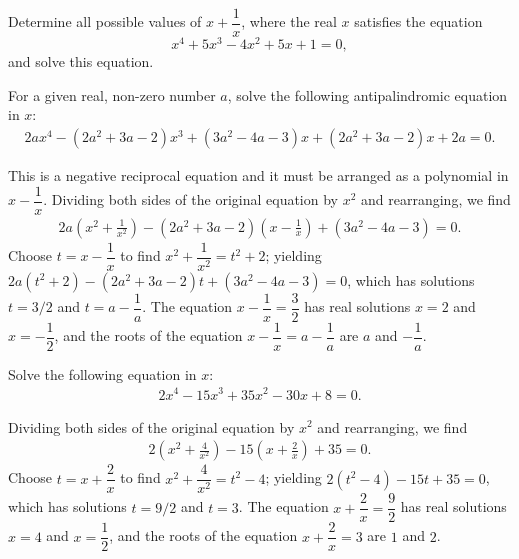 \documentclass[12pt,a4paper]{memoir}
\theoremstyle{definition}
\begin{document}
\begin{question}[name={2000 Denmark (Georg Mohr)}]
	Determine all possible values of $x+\dfrac{1}{x}$, where the real $x$ satisfies the equation
	\[x^4 + 5x^3 - 4x^2 + 5x + 1 = 0,\] and solve this equation.
\end{question}




\begin{question}
	For a given real, non-zero number $a$, solve the following antipalindromic equation in $x$:
	\begin{align*}
		2ax^4-(2a^2+3a-2)x^3+(3a^2-4a-3)x+(2a^2+3a-2)x+2a=0.
	\end{align*}
\end{question}

\begin{solution}
	This is a negative reciprocal equation and it must be arranged as a polynomial in $x-\dfrac{1}{x}$. Dividing both sides of the original equation by $x^2$ and rearranging, we find 
	\begin{align*}
		2a\left(x^2+\frac{1}{x^2}\right) - (2a^2+3a-2)\left(x-\frac{1}{x}\right) + (3a^2-4a-3)=0.
	\end{align*}
	Choose $t=x-\dfrac{1}{x}$ to find $x^2+\dfrac{1}{x^2}=t^2+2$; yielding $2a(t^2+2)-(2a^2+3a-2)t+(3a^2-4a-3)=0$, which has solutions $t=3/2$ and $t=a-\dfrac{1}{a}$. The equation $x-\dfrac{1}{x}=\dfrac{3}{2}$ has real solutions $x=2$ and $x=-\dfrac{1}{2}$, and the roots of the equation $x-\dfrac{1}{x}=a-\dfrac{1}{a}$ are $a$ and $-\dfrac{1}{a}$. 
\end{solution}


\begin{question}
	Solve the following equation in $x$:
	\begin{align*}
		2x^4-15x^3+35x^2-30x+8=0.
	\end{align*}
\end{question}

\begin{solution}
	Dividing both sides of the original equation by $x^2$ and rearranging, we find 
	\begin{align*}
		2\left(x^2+\frac{4}{x^2}\right) - 15\left(x+\frac{2}{x}\right) + 35=0.
	\end{align*}
	Choose $t=x+\dfrac{2}{x}$ to find $x^2+\dfrac{4}{x^2}=t^2-4$; yielding $2(t^2-4)-15t+35=0$, which has solutions $t=9/2$ and $t=3$. The equation $x+\dfrac{2}{x}=\dfrac{9}{2}$ has real solutions $x=4$ and $x=\dfrac{1}{2}$, and the roots of the equation $x+\dfrac{2}{x}=3$ are $1$ and $2$. 
\end{solution}
\end{document}

